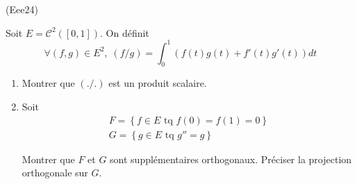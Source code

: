 \begin{tiny}(Eee24)\end{tiny} Soit $E=\mathcal{C}^2([0,1])$. On définit
\begin{displaymath}
\forall (f,g)\in E^2, \;
(f/g) = \int_0^1\left( f(t)g(t) + f'(t)g'(t)\right)dt 
\end{displaymath}
\begin{enumerate}
  \item Montrer que $(./.)$ est un produit scalaire.
  \item Soit 
\begin{multline*}
F = \left\lbrace f\in E\text{ tq } f(0)=f(1)=0 \right\rbrace\\
G = \left\lbrace g\in E \text{ tq } g'' = g\right\rbrace 
\end{multline*}

Montrer que $F$ et $G$ sont supplémentaires orthogonaux. Préciser la projection orthogonale sur $G$.
\end{enumerate}
